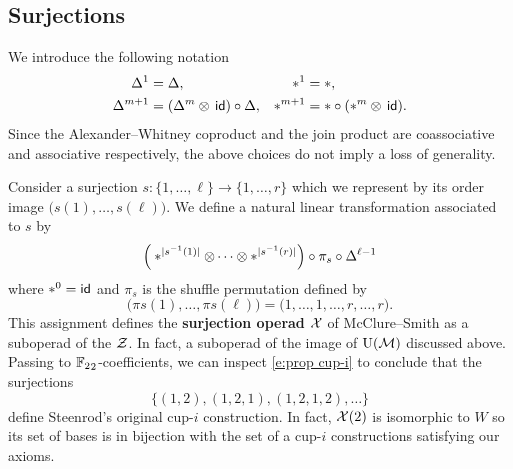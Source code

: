 
\subsection{Surjections}

We introduce the following notation
\begin{align*}
\Delta^1 &= \Delta, &
\ast^1 &= \ast, \\
\Delta^{m+1} &= (\Delta^m \otimes \, \mathsf{id}) \circ \Delta, &
\ast^{m+1} &= \ast \circ (\ast^m \otimes \, \mathsf{id}).
\end{align*}
Since the Alexander--Whitney coproduct and the join product are coassociative and associative respectively, the above choices do not imply a loss of generality.

Consider a surjection $s \colon \{1, \dots, \ell\} \to \{1, \dots, r\}$ which we represent by its order image $\big( s(1), \dots, s(\ell) \big)$.
We define a natural linear transformation associated to $s$ by
\begin{equation}\label{e:surjection action}
\Big( \ast^{\lvert s^{-1}(1)\rvert} \otimes \dotsb \otimes \ast^{\lvert s^{-1}(r)\rvert} \Big) \circ \pi_s \circ \Delta^{\ell-1}
\end{equation}
where $\ast^0 = \mathsf{id}$ and $\pi_s$ is the shuffle permutation defined by
\[
\big( \pi s(1), \dots, \pi s(\ell) \big) =
\big( 1, \dots, 1, \dots, r, \dots, r \big).
\]
This assignment defines the \textbf{surjection operad} $\mathcal{X}$ of McClure--Smith \cite{mcclure2003multivariable} as a suboperad of the $\mathcal{Z}$.
In fact, a suboperad of the image of $\operatorname{U}(\mathcal{M})$ discussed above.
Passing to ${\mathbb{F}_2}_2$-coefficients, we can inspect \cref{e:prop cup-i} to conclude that the surjections
\[
\big\{ (1,2), (1,2,1), (1,2,1,2), \dots \big\}
\]
define Steenrod's original \mbox{cup-$i$} construction.
In fact, $\mathcal{X}(2)$ is isomorphic to $W$ so its set of bases is in bijection with the set of a \mbox{cup-$i$} constructions satisfying our axioms.

